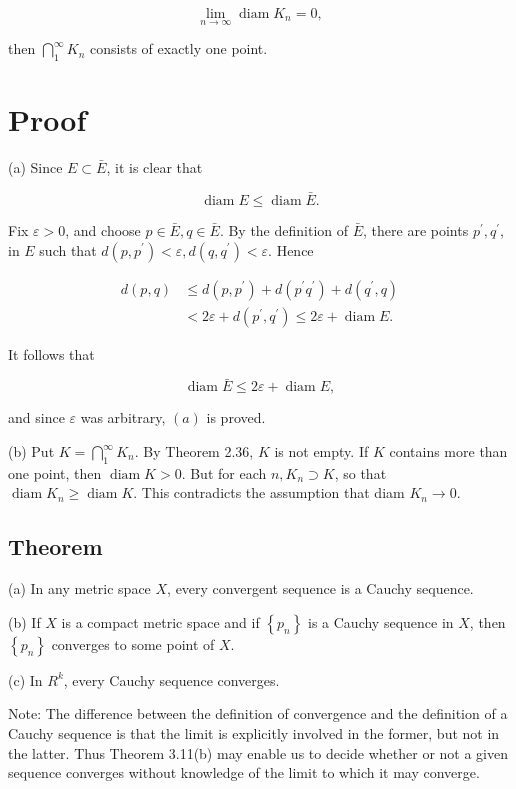 \documentclass[10pt]{article}
\begin{document}
$$
\lim _{n \rightarrow \infty} \operatorname{diam} K_{n}=0,
$$

then $\bigcap_{1}^{\infty} K_{n}$ consists of exactly one point.

\section{Proof}
(a) Since $E \subset \bar{E}$, it is clear that

$$
\operatorname{diam} E \leq \operatorname{diam} \bar{E} .
$$

Fix $\varepsilon>0$, and choose $p \in \bar{E}, q \in \bar{E}$. By the definition of $\bar{E}$, there are points $p^{\prime}, q^{\prime}$, in $E$ such that $d\left(p, p^{\prime}\right)<\varepsilon, d\left(q, q^{\prime}\right)<\varepsilon$. Hence

$$
\begin{aligned}
d(p, q) & \leq d\left(p, p^{\prime}\right)+d\left(p^{\prime} q^{\prime}\right)+d\left(q^{\prime}, q\right) \\
& <2 \varepsilon+d\left(p^{\prime}, q^{\prime}\right) \leq 2 \varepsilon+\operatorname{diam} E .
\end{aligned}
$$

It follows that

$$
\operatorname{diam} \bar{E} \leq 2 \varepsilon+\operatorname{diam} E,
$$

and since $\varepsilon$ was arbitrary, $(a)$ is proved.

(b) Put $K=\bigcap_{1}^{\infty} K_{n}$. By Theorem 2.36, $K$ is not empty. If $K$ contains more than one point, then $\operatorname{diam} K>0$. But for each $n, K_{n} \supset K$, so that $\operatorname{diam} K_{n} \geq \operatorname{diam} K$. This contradicts the assumption that diam $K_{n} \rightarrow 0$.

\subsection{Theorem}
(a) In any metric space $X$, every convergent sequence is a Cauchy sequence.

(b) If $X$ is a compact metric space and if $\left\{p_{n}\right\}$ is a Cauchy sequence in $X$, then $\left\{p_{n}\right\}$ converges to some point of $X$.

(c) In $R^{k}$, every Cauchy sequence converges.

Note: The difference between the definition of convergence and the definition of a Cauchy sequence is that the limit is explicitly involved in the former, but not in the latter. Thus Theorem 3.11(b) may enable us to decide whether or not a given sequence converges without knowledge of the limit to which it may converge.
\end{document}
